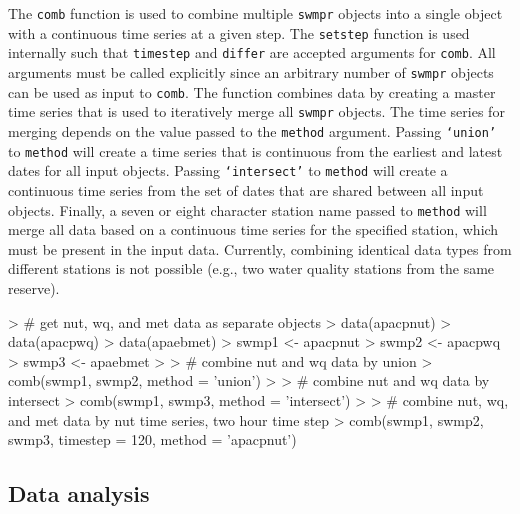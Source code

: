 The \texttt{comb} function is used to combine multiple \texttt{swmpr} objects into a single object with a continuous time series at a given step.  The \texttt{setstep} function is used internally such that \texttt{timestep} and \texttt{differ} are accepted arguments for \texttt{comb}.  All arguments must be called explicitly since an arbitrary number of \texttt{swmpr} objects can be used as input to \texttt{comb}.  The function combines data by creating a master time series that is used to iteratively merge all \texttt{swmpr} objects.  The time series for merging depends on the value passed to the \texttt{method} argument.  Passing \texttt{`union'} to \texttt{method} will create a time series that is continuous from the earliest and latest dates for all input objects.  Passing \texttt{`intersect'} to \texttt{method} will create a continuous time series from the set of dates that are shared between all input objects.  Finally, a seven or eight character station name passed to \texttt{method} will merge all data based on a continuous time series for the specified station, which must be present in the input data.  Currently, combining identical data types from different stations is not possible (e.g., two water quality stations from the same reserve).  

\begin{example}
> # get nut, wq, and met data as separate objects
> data(apacpnut)
> data(apacpwq)
> data(apaebmet)
> swmp1 <- apacpnut
> swmp2 <- apacpwq
> swmp3 <- apaebmet
> 
> # combine nut and wq data by union
> comb(swmp1, swmp2, method = 'union')
> 
> # combine nut and wq data by intersect
> comb(swmp1, swmp3, method = 'intersect')
> 
> # combine nut, wq, and met data by nut time series, two hour time step
> comb(swmp1, swmp2, swmp3, timestep = 120, method = 'apacpnut')
\end{example}

\subsection{Data analysis}

